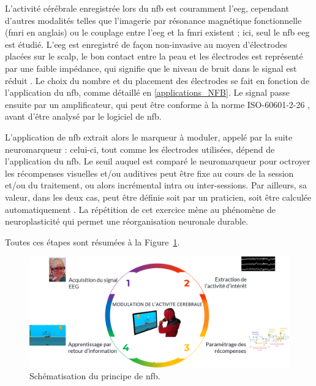 L'activité cérébrale enregistrée lors du \gls{nfb} est couramment l'\gls{eeg}, cependant d'autres modalités telles que l'imagerie par résonance 
magnétique fonctionnelle (\gls{fmri} en anglais) \citep{Sulzer2013} ou le couplage entre l'\gls{eeg} et la \gls{fmri} \citep{Perronnet2017} existent ; ici,
seul le \gls{nfb} \gls{eeg} est étudié. L'\gls{eeg} est enregistré de façon non-invasive au moyen d'électrodes placées sur le scalp, 
le bon contact entre la peau et les électrodes est représenté par une faible impédance, qui signifie que le niveau de bruit dans le 
signal est réduit \citep{Kappenman2010}. Le choix du nombre et du placement des électrodes se fait en fonction de l'application du \gls{nfb}, comme détaillé en 
\ref{applications_NFB}. Le signal passe ensuite par un amplificateur, qui peut être conforme à la norme ISO-60601-2-26 \citep{ISO}, avant d'être analysé 
par le logiciel de \gls{nfb}. 

L'application de \gls{nfb} extrait alors le marqueur à moduler, appelé par la suite neuromarqueur : celui-ci, tout comme les électrodes utilisées, 
dépend de l'application du \gls{nfb}. Le seuil auquel est comparé le neuromarqueur pour octroyer les récompenses visuelles et/ou auditives peut être fixe 
au cours de la session et/ou du traitement, ou alors incrémental intra ou inter-sessions. Par ailleurs, sa valeur, dans 
les deux cas, peut être définie soit par un praticien, soit être calculée automatiquement \citep{Arns2014}. La répétition de cet exercice mène au phénomène de 
neuroplasticité \citep{VanDoren2017, Ros2010} qui permet une réorganisation neuronale durable.

Toutes ces étapes sont résumées à la Figure~\ref{Figure:introduction_nfb_explications}.

\begin{figure}[h!]
  \centering
	\includegraphics[width=1\linewidth]{figures/chapter-1/introduction-nfb-explication} 
  \caption{Schématisation du principe de \gls{nfb}.}
  \label{Figure:introduction_nfb_explications}
\end{figure}

